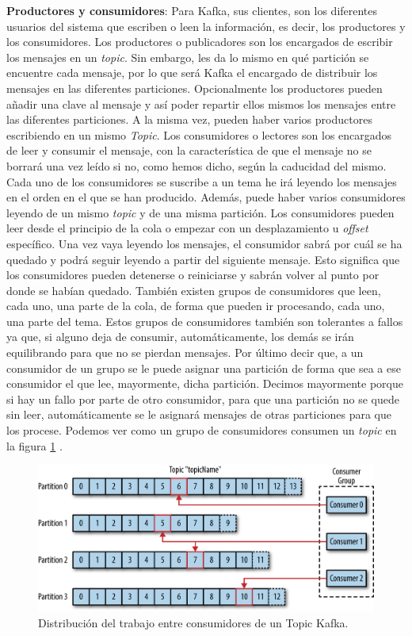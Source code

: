 \textbf{Productores y consumidores}: Para Kafka, sus clientes, son los
diferentes usuarios del sistema que escriben o leen la información, es
decir, los productores y los consumidores. Los productores o publicadores
son los encargados de escribir los mensajes en un \emph{topic}. Sin embargo, les
da lo mismo en qué partición se encuentre cada mensaje, por lo que será
Kafka el encargado de distribuir los mensajes en las diferentes
particiones. Opcionalmente los productores pueden añadir una clave al
mensaje y así poder repartir ellos mismos los mensajes entre las diferentes
particiones. A la misma vez, pueden haber varios productores escribiendo en
un mismo \emph{Topic}. Los consumidores o lectores son los encargados de leer y
consumir el mensaje, con la característica de que el mensaje no se borrará
una vez leído si no, como hemos dicho, según la caducidad del mismo. Cada
uno de los consumidores se suscribe a un tema he irá leyendo los mensajes
en el orden en el que se han producido. Además, puede haber varios
consumidores leyendo de un mismo \emph{topic} y de una misma partición. Los
consumidores pueden leer desde el principio de la cola o empezar con un
desplazamiento u \emph{offset} específico. Una vez vaya leyendo los mensajes, el
consumidor sabrá por cuál se ha quedado y podrá seguir leyendo a partir del
siguiente mensaje. Esto significa que los consumidores pueden detenerse o
reiniciarse y sabrán volver al punto por donde se habían quedado. También
existen grupos de consumidores que leen, cada uno, una parte de la cola, de
forma que pueden ir procesando, cada uno, una parte del tema. Estos grupos
de consumidores también son tolerantes a fallos ya que, si alguno deja de
consumir, automáticamente, los demás se irán equilibrando para que no se
pierdan mensajes. Por último decir que, a un consumidor de un grupo se le
puede asignar una partición de forma que sea a ese consumidor el que lee,
mayormente, dicha partición. Decimos mayormente porque si hay un fallo por
parte de otro consumidor, para que una partición no se quede sin leer,
automáticamente se le asignará mensajes de otras particiones para que los
procese. Podemos ver como un grupo de consumidores consumen un \emph{topic} en la
figura \ref{Kfk-img-2} \cite{Kfk-1}.

\begin{figure}[htp]
\centering
\includegraphics[scale=0.30]{Imagenes/kafka2.png}
\caption{Distribución del trabajo entre consumidores de un Topic Kafka.}
\label{Kfk-img-2}
\end{figure}

